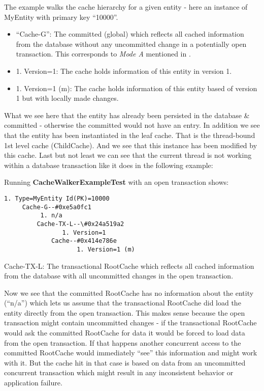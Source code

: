 The example walks the cache hierarchy for a given entity - here an instance of MyEntity with primary key ``10000''.
\begin{itemize}
	\item ``Cache-G'': The committed (global)  which reflects all cached information from the database without any uncommitted change in a potentially open transaction. This corresponds to \emph{Mode A} mentioned in .
	\item 1. Version=1: The cache holds information of this entity in version 1.
	\item 1. Version=1 (m): The cache holds information of this entity based of version 1 but with locally made changes.
\end{itemize}

What we see here that the entity has already been persisted in the database \& committed - otherwise the committed  would not have an entry. In addition we see that the entity has been instantiated in the leaf cache. That is the thread-bound 1st level cache (ChildCache). And we see that this instance has been modified by this cache. Last but not least we can see that the current thread is not working within a database transaction like it does in the following example:\newline

Running \textbf{CacheWalkerExampleTest} with an open transaction shows:

\begin{lstlisting}[style=Console]
	1. Type=MyEntity Id(PK)=10000
	 Cache-G--#0xe5a0fc1
		  1. n/a
		 Cache-TX-L--\#0x24a519a2
				1. Version=1
			 Cache--#0x414e786e
					1. Version=1 (m)
\end{lstlisting}

Cache-TX-L: The transactional RootCache which reflects all cached information from the database with all uncommitted changes in the open transaction.\newline

Now we see that the committed RootCache has no information about the entity (``n/a'') which lets us assume that the transactional RootCache did load the entity directly from the open transaction. This makes sense because the open transaction might contain uncommitted changes - if the transactional RootCache would ask the committed RootCache for data it would be forced to load data from the open transaction. If that happens another concurrent access to the committed RootCache would immediately ``see'' this information and might work with it. But the cache hit in that case is based on data from an uncommitted concurrent transaction which might result in any inconsistent behavior or application failure.